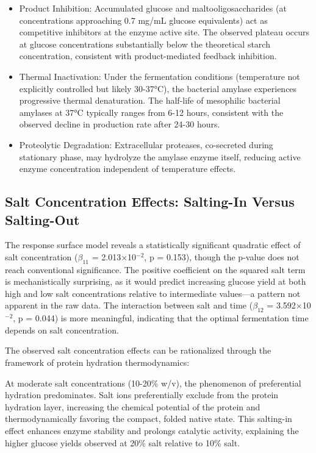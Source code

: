 \documentclass[
  12pt,
]{article}
\begin{document}
\begin{itemize}
\item
  Product Inhibition: Accumulated glucose and maltooligosaccharides (at
  concentrations approaching 0.7 mg/mL glucose equivalents) act as
  competitive inhibitors at the enzyme active site. The observed plateau
  occurs at glucose concentrations substantially below the theoretical
  starch concentration, consistent with product-mediated feedback
  inhibition.
\item
  Thermal Inactivation: Under the fermentation conditions (temperature
  not explicitly controlled but likely 30-37°C), the bacterial amylase
  experiences progressive thermal denaturation. The half-life of
  mesophilic bacterial amylases at 37°C typically ranges from 6-12
  hours, consistent with the observed decline in production rate after
  24-30 hours.
\item
  Proteolytic Degradation: Extracellular proteases, co-secreted during
  stationary phase, may hydrolyze the amylase enzyme itself, reducing
  active enzyme concentration independent of temperature effects.
\end{itemize}

\subsection{Salt Concentration Effects: Salting-In Versus
Salting-Out}\label{salt-concentration-effects-salting-in-versus-salting-out}

The response surface model reveals a statistically significant quadratic
effect of salt concentration (\(\beta_{11}\) = 2.013×10\(^{-2}\), p =
0.153), though the p-value does not reach conventional significance. The
positive coefficient on the squared salt term is mechanistically
surprising, as it would predict increasing glucose yield at both high
and low salt concentrations relative to intermediate values---a pattern
not apparent in the raw data. The interaction between salt and time
(\(\beta_{12}\) = 3.592×10\(^{-2}\), p = 0.044) is more meaningful,
indicating that the optimal fermentation time depends on salt
concentration.

The observed salt concentration effects can be rationalized through the
framework of protein hydration thermodynamics:

At moderate salt concentrations (10-20\% w/v), the phenomenon of
preferential hydration predominates. Salt ions preferentially exclude
from the protein hydration layer, increasing the chemical potential of
the protein and thermodynamically favoring the compact, folded native
state. This salting-in effect enhances enzyme stability and prolongs
catalytic activity, explaining the higher glucose yields observed at
20\% salt relative to 10\% salt.
\end{document}

